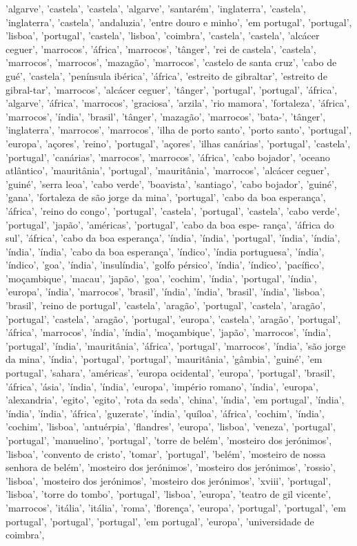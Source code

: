 \documentclass{article}
\begin{document}
\begin{itemize}
'algarve', 'castela', 'castela', 'algarve', 'santarém', 'inglaterra', 'castela', 'inglaterra', 'castela', 'andaluzia', 'entre douro e minho', 'em portugal', 'portugal', 'lisboa', 'portugal', 'castela', 'lisboa', 'coimbra', 'castela', 'castela', 'alcácer ceguer', 'marrocos', 'áfrica', 'marrocos', 'tânger', 'rei de castela', 'castela', 'marrocos', 'marrocos', 'mazagão', 'marrocos', 'castelo de santa cruz', 'cabo de gué', 'castela', 'península ibérica', 'áfrica', 'estreito de gibraltar', 'estreito de gibral-tar', 'marrocos', 'alcácer ceguer', 'tânger', 'portugal', 'portugal', 'áfrica', 'algarve', 'áfrica', 'marrocos', 'graciosa', 'arzila', 'rio mamora', 'fortaleza', 'áfrica', 'marrocos', 'índia', 'brasil', 'tânger', 'mazagão', 'marrocos', 'bata-', 'tânger', 'inglaterra', 'marrocos', 'marrocos', 'ilha de porto santo', 'porto santo', 'portugal', 'europa', 'açores', 'reino', 'portugal', 'açores', 'ilhas canárias', 'portugal', 'castela', 'portugal', 'canárias', 'marrocos', 'marrocos', 'áfrica', 'cabo bojador', 'oceano atlântico', 'mauritânia', 'portugal', 'mauritânia', 'marrocos', 'alcácer ceguer', 'guiné', 'serra leoa', 'cabo verde', 'boavista', 'santiago', 'cabo bojador', 'guiné', 'gana', 'fortaleza de são jorge da mina', 'portugal', 'cabo da boa esperança', 'áfrica', 'reino do congo', 'portugal', 'castela', 'portugal', 'castela', 'cabo verde', 'portugal', 'japão', 'américas', 'portugal', 'cabo da boa espe- rança', 'áfrica do sul', 'áfrica', 'cabo da boa esperança', 'índia', 'índia', 'portugal', 'índia', 'índia', 'índia', 'índia', 'cabo da boa esperança', 'índico', 'índia portuguesa', 'índia', 'índico', 'goa', 'índia', 'insulíndia', 'golfo pérsico', 'índia', 'índico', 'pacífico', 'moçambique', 'macau', 'japão', 'goa', 'cochim', 'índia', 'portugal', 'índia', 'europa', 'índia', 'marrocos', 'brasil', 'índia', 'índia', 'brasil', 'índia', 'lisboa', 'brasil', 'reino de portugal', 'castela', 'aragão', 'portugal', 'castela', 'aragão', 'portugal', 'castela', 'aragão', 'portugal', 'europa', 'castela', 'aragão', 'portugal', 'áfrica', 'marrocos', 'índia', 'índia', 'moçambique', 'japão', 'marrocos', 'índia', 'portugal', 'índia', 'mauritânia', 'áfrica', 'portugal', 'marrocos', 'índia', 'são jorge da mina', 'índia', 'portugal', 'portugal', 'mauritânia', 'gâmbia', 'guiné', 'em portugal', 'sahara', 'américas', 'europa ocidental', 'europa', 'portugal', 'brasil', 'áfrica', 'ásia', 'índia', 'índia', 'europa', 'império romano', 'índia', 'europa', 'alexandria', 'egito', 'egito', 'rota da seda', 'china', 'índia', 'em portugal', 'índia', 'índia', 'índia', 'áfrica', 'guzerate', 'índia', 'quíloa', 'áfrica', 'cochim', 'índia', 'cochim', 'lisboa', 'antuérpia', 'flandres', 'europa', 'lisboa', 'veneza', 'portugal', 'portugal', 'manuelino', 'portugal', 'torre de belém', 'mosteiro dos jerónimos', 'lisboa', 'convento de cristo', 'tomar', 'portugal', 'belém', 'mosteiro de nossa senhora de belém', 'mosteiro dos jerónimos', 'mosteiro dos jerónimos', 'rossio', 'lisboa', 'mosteiro dos jerónimos', 'mosteiro dos jerónimos', 'xviii', 'portugal', 'lisboa', 'torre do tombo', 'portugal', 'lisboa', 'europa', 'teatro de gil vicente', 'marrocos', 'itália', 'itália', 'roma', 'florença', 'europa', 'portugal', 'portugal', 'em portugal', 'portugal', 'portugal', 'em portugal', 'europa', 'universidade de coimbra', 
\end{itemize}
\end{document}
